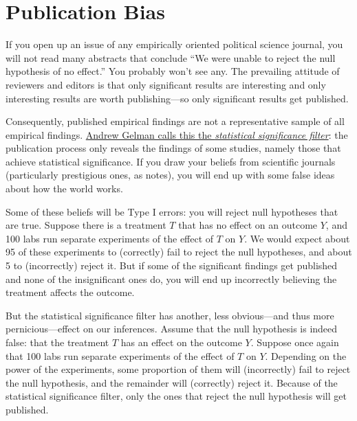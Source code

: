 \documentclass[12pt,oneside,openany]{book}
\begin{document}
\section{Publication Bias}\label{publication-bias}

If you open up an issue of any empirically oriented political science
journal, you will not read many abstracts that conclude ``We were unable
to reject the null hypothesis of no effect.'' You probably won't see
any. The prevailing attitude of reviewers and editors is that only
significant results are interesting and only interesting results are
worth publishing---so only significant results get published.

Consequently, published empirical findings are not a representative
sample of all empirical findings.
\href{http://andrewgelman.com/2011/09/10/the-statistical-significance-filter/}{Andrew
Gelman calls this the \emph{statistical significance filter}}: the
publication process only reveals the findings of some studies, namely
those that achieve statistical significance. If you draw your beliefs
from scientific journals (particularly prestigious ones, as
\citet{ioannidis2008most} notes), you will end up with some false ideas
about how the world works.

Some of these beliefs will be Type I errors: you will reject null
hypotheses that are true. Suppose there is a treatment \(T\) that has no
effect on an outcome \(Y\), and 100 labs run separate experiments of the
effect of \(T\) on \(Y\). We would expect about 95 of these experiments
to (correctly) fail to reject the null hypotheses, and about 5 to
(incorrectly) reject it. But if some of the significant findings get
published and none of the insignificant ones do, you will end up
incorrectly believing the treatment affects the outcome.

But the statistical significance filter has another, less obvious---and
thus more pernicious---effect on our inferences. Assume that the null
hypothesis is indeed false: that the treatment \(T\) has an effect on
the outcome \(Y\). Suppose once again that 100 labs run separate
experiments of the effect of \(T\) on \(Y\). Depending on the power of
the experiments, some proportion of them will (incorrectly) fail to
reject the null hypothesis, and the remainder will (correctly) reject
it. Because of the statistical significance filter, only the ones that
reject the null hypothesis will get published.
\end{document}
